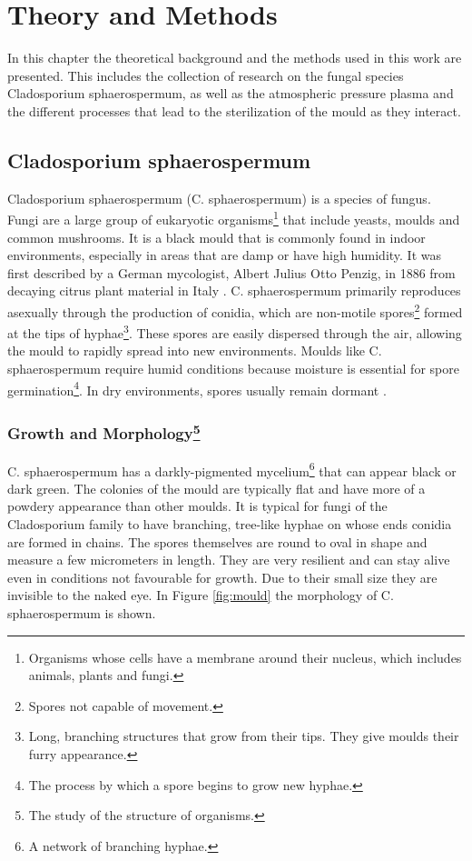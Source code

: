 \chapter{Theory and Methods}
\label{chap:theory}

In this chapter the theoretical background and the methods used in this work are presented. This includes the collection of research on the fungal species Cladosporium sphaerospermum, as well as the atmospheric pressure plasma and the different processes that lead to the sterilization of the mould as they interact. 

\section{Cladosporium sphaerospermum}
Cladosporium sphaerospermum (C. sphaerospermum) is a species of fungus. Fungi are a large group of eukaryotic organisms\footnote{Organisms whose cells have a membrane around their nucleus, which includes animals, plants and fungi.}  that include yeasts, moulds and common mushrooms. It is a black mould that is commonly found in indoor environments, especially in areas that are damp or have high humidity. It was first described by a German mycologist, Albert Julius Otto Penzig, in 1886 from decaying citrus plant material in Italy \cite{mould}. C. sphaerospermum primarily reproduces asexually through the production of conidia, which are non-motile spores\footnote{Spores not capable of movement.} formed at the tips of hyphae\footnote{Long, branching structures that grow from their tips. They give moulds their furry appearance.}. These spores are easily dispersed through the air, allowing the mould to rapidly spread into new environments. Moulds like C. sphaerospermum require humid conditions because moisture is essential for spore germination\footnote{The process by which a spore begins to grow new hyphae.}. In dry environments, spores usually remain dormant \cite{growth}.

\subsection{Growth and Morphology\footnote{The study of the structure of organisms.}}
C. sphaerospermum has a darkly-pigmented mycelium\footnote{A network of branching hyphae.} that can appear black or dark green. The colonies of the mould are typically flat and have more of a powdery appearance than other moulds. It is typical for fungi of the Cladosporium family to have branching, tree-like hyphae on whose ends conidia are formed in chains. The spores themselves are round to oval in shape and measure a few micrometers in length. They are very resilient and can stay alive even in conditions not favourable for growth. Due to their small size they are invisible to the naked eye. In Figure \ref{fig:mould} the morphology of C. sphaerospermum is shown. 

